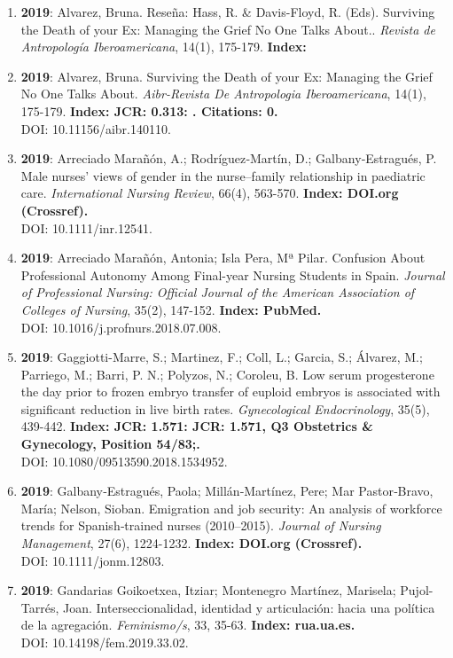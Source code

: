 \begin{enumerate}
\item {\bf 2019}: Alvarez, Bruna.  Reseña: Hass, R. \& Davis-Floyd, R. (Eds). Surviving the Death of your Ex: Managing the Grief No One Talks About.. {\it Revista de Antropología Iberoamericana}, 14(1), 175-179. {\bf Index: } \filbreak
\item {\bf 2019}: Alvarez, Bruna.  Surviving the Death of your Ex: Managing the Grief No One Talks About. {\it Aibr-Revista De Antropologia Iberoamericana}, 14(1), 175-179. {\bf Index: JCR: 0.313: .  Citations: 0. } \\ DOI: 10.11156/aibr.140110. \filbreak
\item {\bf 2019}: Arreciado Marañón, A.; Rodríguez‐Martín, D.; Galbany‐Estragués, P.  Male nurses' views of gender in the nurse–family relationship in paediatric care. {\it International Nursing Review}, 66(4), 563-570. {\bf Index: DOI.org (Crossref). } \\ DOI: 10.1111/inr.12541. \filbreak
\item {\bf 2019}: Arreciado Marañón, Antonia; Isla Pera, Mª Pilar.  Confusion About Professional Autonomy Among Final-year Nursing Students in Spain. {\it Journal of Professional Nursing: Official Journal of the American Association of Colleges of Nursing}, 35(2), 147-152. {\bf Index: PubMed. } \\ DOI: 10.1016/j.profnurs.2018.07.008. \filbreak
\item {\bf 2019}: Gaggiotti-Marre, S.; Martinez, F.; Coll, L.; Garcia, S.; Álvarez, M.; Parriego, M.; Barri, P. N.; Polyzos, N.; Coroleu, B.  Low serum progesterone the day prior to frozen embryo transfer of euploid embryos is associated with significant reduction in live birth rates. {\it Gynecological Endocrinology}, 35(5), 439-442. {\bf Index: JCR: 1.571: JCR: 1.571, Q3 Obstetrics \& Gynecology, Position 54/83;.  } \\ DOI: 10.1080/09513590.2018.1534952. \filbreak
\item {\bf 2019}: Galbany‐Estragués, Paola; Millán‐Martínez, Pere; Mar Pastor‐Bravo, María; Nelson, Sioban.  Emigration and job security: An analysis of workforce trends for Spanish‐trained nurses (2010–2015). {\it Journal of Nursing Management}, 27(6), 1224-1232. {\bf Index: DOI.org (Crossref). } \\ DOI: 10.1111/jonm.12803. \filbreak
\item {\bf 2019}: Gandarias Goikoetxea, Itziar; Montenegro Martínez, Marisela; Pujol-Tarrés, Joan.  Interseccionalidad, identidad y articulación: hacia una política de la agregación. {\it Feminismo/s}, 33, 35-63. {\bf Index: rua.ua.es. } \\ DOI: 10.14198/fem.2019.33.02. \filbreak

\end{enumerate}
